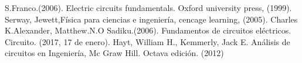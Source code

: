 \documentclass[twocolumn,11pts]{IEEEtran}
\renewcommand{\refname}{Referencias}
\begin{document}
\renewcommand{\refname}{Referencias}

\begin{thebibliography}{5}
 S.Franco.(2006). Electric circuits fundamentals.
Oxford university press, (1999).
 Serway, Jewett,Física para ciencias e ingeniería, cencage learning, (2005).
 Charles K.Alexander, Matthew.N.O Sadiku.(2006). Fundamentos de circuitos eléctricos.
Circuito. (2017, 17 de enero).
 Hayt, William H., Kemmerly, Jack E. Análisis de circuitos en Ingeniería, Mc Graw Hill. Octava edición. (2012)
\end{thebibliography}
\end{document}
